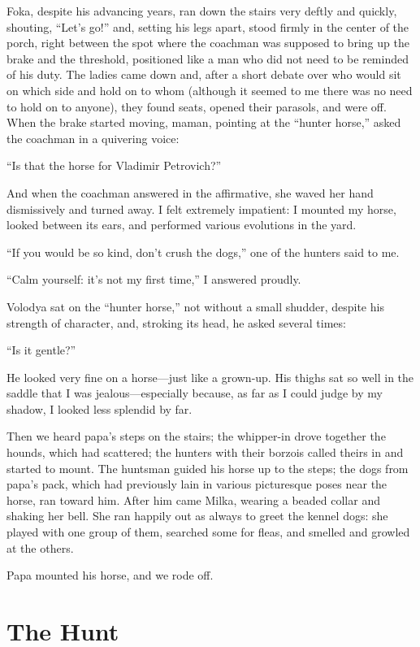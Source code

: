 Foka, despite his advancing years, ran down the stairs very deftly and quickly, shouting, ``Let's go!'' and, setting his legs apart, stood firmly in the center of the porch, right between the spot where the coachman was supposed to bring up the brake and the threshold, positioned like a man who did not need to be reminded of his duty. The ladies came down and, after a short debate over who would sit on which side and hold on to whom (although it seemed to me there was no need to hold on to anyone), they found seats, opened their parasols, and were off. When the brake started moving, maman, pointing at the ``hunter horse,'' asked the coachman in a quivering voice:

``Is that the horse for Vladimir Petrovich?'' %

And when the coachman answered in the affirmative, she waved her hand dismissively and turned away. I felt extremely impatient: I mounted my horse, looked between its ears, and performed various evolutions in the yard.

``If you would be so kind, don't crush the dogs,'' one of the hunters said to me. %

``Calm yourself: it's not my first time,'' I answered proudly. %

Volodya sat on the ``hunter horse,'' not without a small shudder, despite his strength of character, and, stroking its head, he asked several times:

``Is it gentle?'' %

He looked very fine on a horse---just like a grown-up. His thighs sat so well in the saddle that I was jealous---especially because, as far as I could judge by my shadow, I looked less splendid by far.

Then we heard papa's steps on the stairs; the whipper-in drove together the hounds, which had scattered; the hunters with their borzois called theirs in and started to mount. The huntsman guided his horse up to the steps; the dogs from papa's pack, which had previously lain in various picturesque poses near the horse, ran toward him. After him came Milka, wearing a beaded collar and shaking her bell. She ran happily out as always to greet the kennel dogs: she played with one group of them, searched some for fleas, and smelled and growled at the others.

Papa mounted his horse, and we rode off.

\chapter{The Hunt} %

